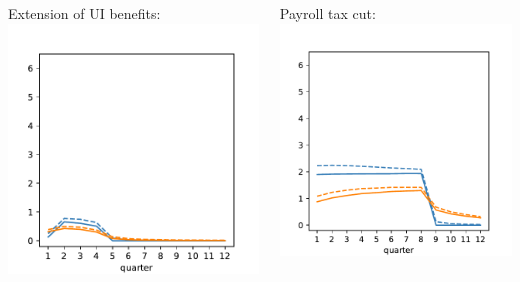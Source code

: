 \documentclass[pdflatex,aspectratio=169, handout]{beamer}
\begin{document}
{\begin{frame}
\begin{columns}
              \begin{column}{0.33\textwidth}  	
                \footnotesize Extension of UI benefits:
                \includegraphics[width=1.2\linewidth]{Code/HA-Models/FromPandemicCode/Figures/recession_UI_relrecession} 
              \end{column}
              
              \begin{column}{0.33\textwidth}  
                \footnotesize Payroll tax cut:	
                \includegraphics[width=1.2\linewidth]{Code/HA-Models/FromPandemicCode/Figures/recession_taxcut_relrecession}
              \end{column}
            \end{columns}

          \end{frame}
        }{}
\end{document}
